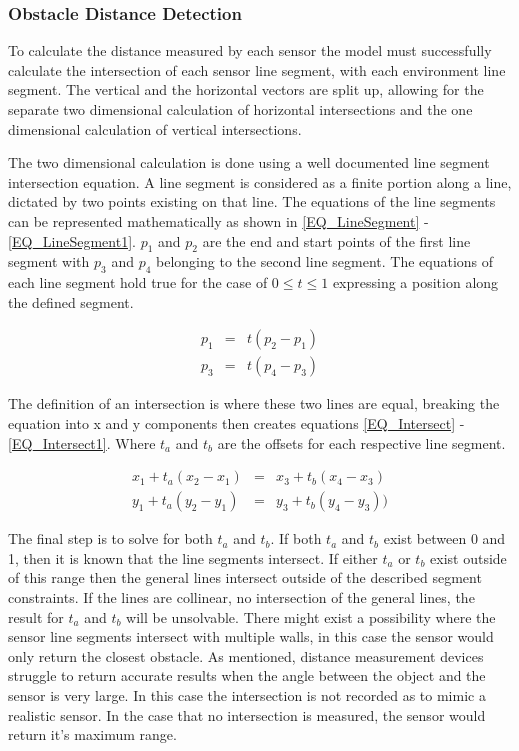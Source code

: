 			\subsubsection{Obstacle Distance Detection}
			To calculate the distance measured by each sensor the model must successfully calculate the intersection of each sensor line segment, with each environment line segment. The vertical and the horizontal vectors are split up, allowing for the separate two dimensional calculation of horizontal intersections and the one dimensional calculation of vertical intersections.
			
			The two dimensional calculation is done using a well documented line segment intersection equation. A line segment is considered as a finite portion along a line, dictated by two points existing on that line. The equations of the line segments can be represented mathematically as shown in \eqref{EQ_LineSegment} - \eqref{EQ_LineSegment1}. $p_1$ and $p_2$ are the end and start points of the first line segment with $p_3$ and $p_4$ belonging to the second line segment. The equations of each line segment hold true for the case of $0 \leq t \leq 1$ expressing a position along the defined segment. 
			
			\begin{eqnarray}
			p_1 &=& t(p_2 - p_1) \label{EQ_LineSegment}\\\label{EQ_LineSegment2}
			p_3 &=& t(p_4 - p_3) \label{EQ_LineSegment1}
			\end{eqnarray}
			
			The definition of an intersection is where these two lines are equal, breaking the equation into x and y components then creates equations \eqref{EQ_Intersect} - \eqref{EQ_Intersect1}. Where $t_a$ and $t_b$ are the offsets for each respective line segment.
			
			\begin{eqnarray}
			x_1 + t_a(x_2 - x_1) &=& x_3 + t_b(x_4 - x_3) \label{EQ_Intersect}\\\label{EQ_Intersect2}
			y_1 + t_a(y_2 - y_1) &=& y_3 + t_b(y_4 - y_3)) \label{EQ_Intersect1}
			\end{eqnarray}
			
			The final step is to solve for both $t_a$ and $t_b$. If both $t_a$ and $t_b$ exist between 0 and 1, then it is known that the line segments intersect. If either $t_a$ or $t_b$ exist outside of this range then the general lines intersect outside of the described segment constraints. If the lines are collinear, no intersection of the general lines, the result for $t_a$ and $t_b$ will be unsolvable. There might exist a possibility where the sensor line segments intersect with multiple walls, in this case the sensor would only return the closest obstacle. As mentioned, distance measurement devices struggle to return accurate results when the angle between the object and the sensor is very large. In this case the intersection is not recorded as to mimic a realistic sensor. In the case that no intersection is measured, the sensor would return it's maximum range.
			
